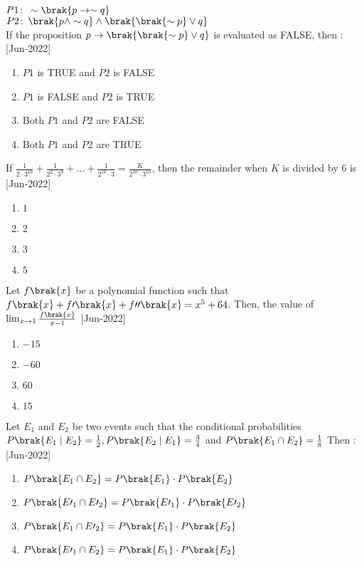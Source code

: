         $P1\colon\,\sim\brak{p \to \sim q}$\\
        $P2\colon\,\brak{p\wedge \sim q}\wedge\brak{\brak{\sim p}\vee q}$\\
        If the proposition $p \to \brak{\brak{\sim p}\vee q}$ is evaluated as FALSE, then $\colon$
        \hfill{[Jun-2022]}
        \begin{enumerate}
            \item $P1$ is TRUE and $P2$ is FALSE
            \item $P1$ is FALSE and $P2$ is TRUE
            \item Both $P1$ and $P2$ are FALSE 
            \item Both $P1$ and $P2$ are TRUE
        \end{enumerate}
    \item If $\frac{1}{2\cdot3^{10}}+\frac{1}{2^2\cdot3^{9}}+\dots +\frac{1}{2^{10}\cdot3}=\frac{K}{2^{10}\cdot3^{10}}$, then the remainder when $K$ is divided by $6$ is
    \hfill{[Jun-2022]}
        \begin{enumerate}
            \item $1$
            \item $2$
            \item $3$
            \item $5$
        \end{enumerate}
    \item Let $f\brak{x}$ be a polynomial function such that $f\brak{x}+f\prime\brak{x}+f\prime\prime\brak{x}=x^5+64$. Then, the value of $\lim_{x \to 1}\frac{f\brak{x}}{x-1}$
    \hfill{[Jun-2022]}
        \begin{enumerate}
            \item $-15$
            \item $-60$
            \item $60$
            \item $15$
        \end{enumerate}
    \item Let $E_1$ and $E_2$ be two events such that the conditional probabilities \\$P\brak{E_1\mid E_2}=\frac{1}{2},P\brak{E_2\mid E_1}=\frac{3}{4}$ and $P\brak{E_1\cap E_2}=\frac{1}{8} $  Then $\colon$
    \hfill{[Jun-2022]}
        \begin{enumerate}
            \item $P\brak{E_1\cap E_2}=P\brak{E_1}\cdot P\brak{E_2}$
            \item $ P\brak{E\prime_1\cap E\prime_2}=P\brak{E\prime_1}\cdot P\brak{E\prime_2} $
            \item $P\brak{E_1\cap E\prime_2}=P\brak{E_1}\cdot P\brak{E_2}$
            \item $P\brak{E\prime_1\cap E_2}=P\brak{E_1}\cdot P\brak{E_2}$
        \end{enumerate}
